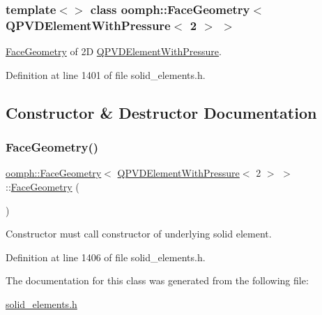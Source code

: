 \subsubsection*{template$<$$>$\newline
class oomph\+::\+Face\+Geometry$<$ Q\+P\+V\+D\+Element\+With\+Pressure$<$ 2 $>$ $>$}

\hyperlink{classoomph_1_1FaceGeometry}{Face\+Geometry} of 2D \hyperlink{classoomph_1_1QPVDElementWithPressure}{Q\+P\+V\+D\+Element\+With\+Pressure}. 

Definition at line 1401 of file solid\+\_\+elements.\+h.



\subsection{Constructor \& Destructor Documentation}
\mbox{\label{classoomph_1_1FaceGeometry_3_01QPVDElementWithPressure_3_012_01_4_01_4_ac297cef6558e3e7ad0b78df5a6325446}} 
\subsubsection{\texorpdfstring{Face\+Geometry()}{FaceGeometry()}}
{\footnotesize\ttfamily \hyperlink{classoomph_1_1FaceGeometry}{oomph\+::\+Face\+Geometry}$<$ \hyperlink{classoomph_1_1QPVDElementWithPressure}{Q\+P\+V\+D\+Element\+With\+Pressure}$<$ 2 $>$ $>$\+::\hyperlink{classoomph_1_1FaceGeometry}{Face\+Geometry} (\begin{DoxyParamCaption}{ }\end{DoxyParamCaption})\hspace{0.3cm}{\ttfamily [inline]}}



Constructor must call constructor of underlying solid element. 



Definition at line 1406 of file solid\+\_\+elements.\+h.



The documentation for this class was generated from the following file\+:\begin{DoxyCompactItemize}
\item 
\hyperlink{solid__elements_8h}{solid\+\_\+elements.\+h}\end{DoxyCompactItemize}
